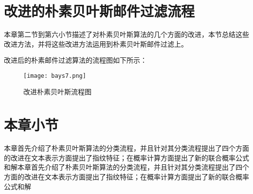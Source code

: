 \section{改进的朴素贝叶斯邮件过滤流程}
本章第二节到第六小节描述了对朴素贝叶斯算法的几个方面的改进，本节总结这些改进方法，并将这些改进方法运用到朴素贝叶斯邮件过滤上。 

改进后的朴素邮件过滤算法的流程图如下所示：
\begin{figure}[htbp]
\centering
\texttt{[image: bays7.png]}
\caption{改进朴素贝叶斯流程图}
\label{fig:logo}
\end{figure}

\newpage


\section{本章小节}
本章首先介绍了朴素贝叶斯算法的分类流程，并且针对其分类流程提出了四个方面的改进在文本表示方面提出了指纹特征；在概率计算方面提出了新的联合概率公式和解本章首先介绍了朴素贝叶斯算法的分类流程，并且针对其分类流程提出了四个方面的改进在文本表示方面提出了指纹特征；在概率计算方面提出了新的联合概率公式和解


